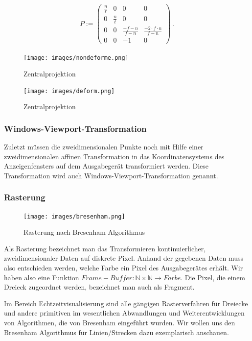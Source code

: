 \begin{align*}
P := \begin{pmatrix}  
\frac{n}{r}  &  0 & 0  & 0  \\
0   &  \frac{n}{t} & 0 & 0  \\
0   &  0 & \frac{-f-n}{f-n} & \frac{-2\cdot f \cdot n}{f-n}  \\
0   &  0 & -1 & 0  
\end{pmatrix}  \; .
\end{align*} 




\begin{figure}[H]
    \centering
    \texttt{[image: images/nondeforme.png]}
    \caption{Zentralprojektion}
    \label{fig:projection-sight-vol}
\end{figure}

\begin{figure}[H]
    \centering
    \texttt{[image: images/deform.png]}
    \caption{Zentralprojektion}
    \label{fig:projection-sight-vol}
\end{figure}

\subsubsection*{Windows-Viewport-Transformation}
Zuletzt müssen die zweidimensionalen Punkte noch mit Hilfe einer 
zweidimensionalen affinen Transformation in das Koordinatensystems des 
Anzeigenfensters auf dem Ausgabegerät transformiert werden. 
Diese Transformation wird auch Windows-Viewport-Transformation genannt.

\subsubsection{Rasterung}
\begin{figure}[H]
    \centering
    \texttt{[image: images/bresenham.png]}
    \caption{Rasterung nach Bresenham Algorithmus}
    \label{fig:screening-bresenham-line}
\end{figure}
Als Rasterung bezeichnet man das Transformieren kontinuierlicher, 
zweidimensionaler Daten auf diskrete Pixel.  
Anhand der gegebenen Daten muss also entschieden werden, welche Farbe ein Pixel des Ausgabegerätes erhält.
Wir haben also eine Funktion 
$Frame-Buffer: \mathbb{N} \times \mathbb{N} \to Farbe$. 
Die Pixel, die einem Dreieck zugeordnet werden, bezeichnet man auch als Fragment.

Im Bereich Echtzeitvisualisierung sind alle gängigen Rasterverfahren für 
Dreiecke und andere primitiven im wesentlichen Abwandlungen und 
Weiterentwicklungen von Algorithmen, die von Bresenham eingeführt wurden. 
Wir wollen uns den Bresenham Algorithmus für Linien/Strecken dazu exemplarisch 
anschauen.


